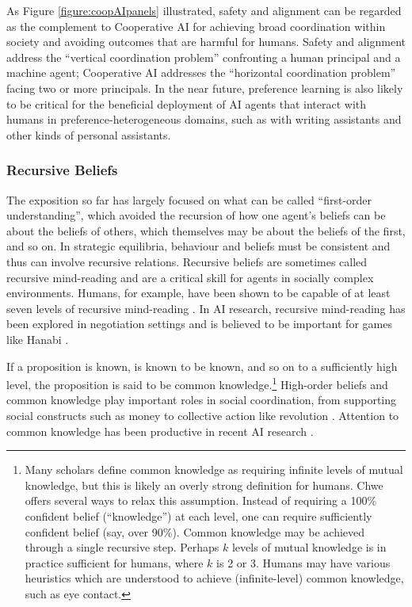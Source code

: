 \documentclass[11pt, a4paper, logo, onecolumn, nonumbering]{deepmind}
\begin{document}
As Figure \ref{figure:coopAIpanels} illustrated, safety and alignment can be regarded as the complement to Cooperative AI for achieving broad coordination within society and avoiding outcomes that are harmful for humans. Safety and alignment address the ``vertical coordination problem'' confronting a human principal and a machine agent; Cooperative AI addresses the ``horizontal coordination problem'' facing two or more principals. In the near future, preference learning is also likely to be critical for the beneficial deployment of AI agents that interact with humans in preference-heterogeneous domains, such as with writing assistants \cite{brown2020language, leike2018scalable} and other kinds of personal assistants. 

\subsubsection{Recursive Beliefs} %
The exposition so far has largely focused on what can be called ``first-order understanding'', which avoided the recursion of how one agent's beliefs can be about the beliefs of others, which themselves may be about the beliefs of the first, and so on.  In strategic equilibria, behaviour and beliefs must be consistent and thus can involve recursive relations.
Recursive beliefs are sometimes called recursive mind-reading and are a critical skill for agents in socially complex environments. Humans, for example, have been shown to be capable of at least seven levels of recursive mind-reading \cite{o2015ease}. In AI research, recursive mind-reading has been explored in negotiation settings  \cite{Weerd2015NegotiatingWO, de2017negotiating} and is believed to be important for games like Hanabi \cite{bard2020hanabi}.%

If a proposition is known, is known to be known, and so on to a sufficiently high level, the proposition is said to be common knowledge.\footnote{Many scholars define common knowledge as requiring infinite levels of mutual knowledge, but this is likely an overly strong definition for humans. Chwe \cite[75-77]{chwe2013rational} offers several ways to relax this assumption. Instead of requiring a 100\% confident belief (``knowledge'') at each level, one can require sufficiently confident belief (say, over 90\%). Common knowledge may be achieved through a single recursive step. Perhaps $k$ levels of mutual knowledge is in practice sufficient for humans, where $k$ is 2 or 3. Humans may have various heuristics which are understood to achieve (infinite-level) common knowledge, such as eye contact.} High-order beliefs and common knowledge play important roles in social coordination, from supporting social constructs such as money \cite{harari2015sapiens, searle1995construction}
to collective action like revolution \cite{lohmann1994dynamics}. Attention to common knowledge has been productive in recent AI research \cite{DBLP:journals/corr/abs-1810-11702}%
. %
\end{document}
